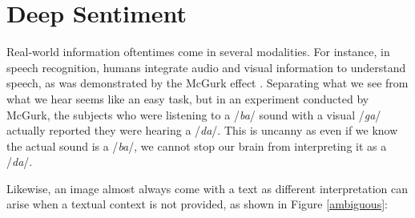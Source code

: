 \chapter{Deep Sentiment}

Real-world information oftentimes come in several modalities. For instance, in speech recognition, humans integrate audio and visual information to understand speech, as was demonstrated by the McGurk effect \cite{mcgurk}. Separating what we see from what we hear seems like an easy task, but in an experiment conducted by McGurk, the subjects who were listening to a /{\em ba}/ sound with a visual /{\em ga}/ actually reported they were hearing a /{\em da}/. This is uncanny as even if we know the actual sound is a /{\em ba}/, we cannot stop our brain from interpreting it as a /{\em da}/.

Likewise, an image almost always come with a text as different interpretation can arise when a textual context is not provided, as shown in Figure \ref{ambiguous}:

